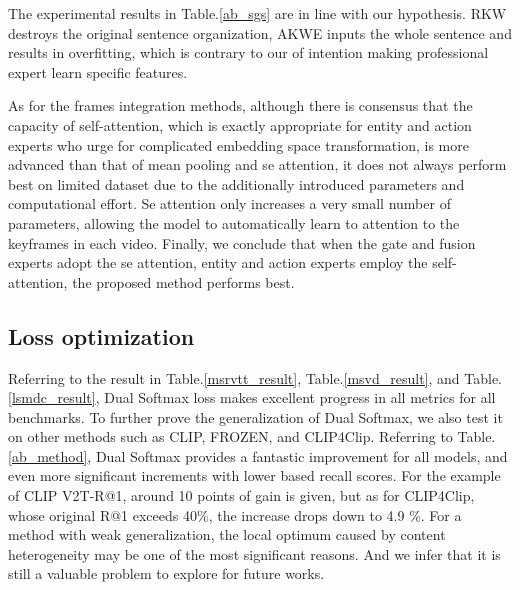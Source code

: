 \documentclass[letterpaper]{article} \usepackage{aaai22}  \usepackage{times}  \usepackage{helvet}  \usepackage{courier}  \usepackage[hyphens]{url}  \usepackage{graphicx} \urlstyle{rm} \def\UrlFont{\rm}  \usepackage{natbib}  \usepackage{caption}
\begin{document}
The experimental results in Table.\ref{ab_sgs} are in line with our hypothesis. RKW destroys the original sentence organization, AKWE inputs the whole sentence and results in overfitting, which is contrary to our of intention making professional expert learn specific features. 


As for the frames integration methods, although there is consensus that the capacity of self-attention, which is exactly appropriate for entity and action experts who urge for complicated embedding space transformation, is more advanced than that of mean pooling and se attention, it does not always perform best on limited dataset due to the additionally introduced parameters and computational effort. Se attention only increases a very small number of parameters, allowing the model to automatically learn to attention to the keyframes in each video. Finally, we conclude that when the gate and fusion experts adopt the se attention, entity and action experts employ the self-attention, the proposed method performs best. 

\subsection{Loss optimization}

Referring to the result in Table.\ref{msrvtt_result}, Table.\ref{msvd_result}, and Table.\ref{lsmdc_result}, Dual Softmax loss makes excellent progress in all metrics for all benchmarks. To further prove the generalization of Dual Softmax, we also test it on other methods such as CLIP, FROZEN, and CLIP4Clip. Referring to Table.\ref{ab_method}, Dual Softmax provides a fantastic improvement for all models, and even more significant increments with lower based recall scores. For the example of CLIP V2T-R@1, around 10 points of gain is given, but as for CLIP4Clip, whose original R@1 exceeds 40\%, the increase drops down to 4.9 \%. For a method with weak generalization, the local optimum caused by content heterogeneity may be one of the most significant reasons. And we infer that it is still a valuable problem to explore for future works.


\begin{table}[h]
\centering
\caption{Ablation study of Dual Softmax for various methods. T2V and V2T denote Text-to-Video and Video-to-Text.}
\label{ab_method}
\end{table}
\end{document}
